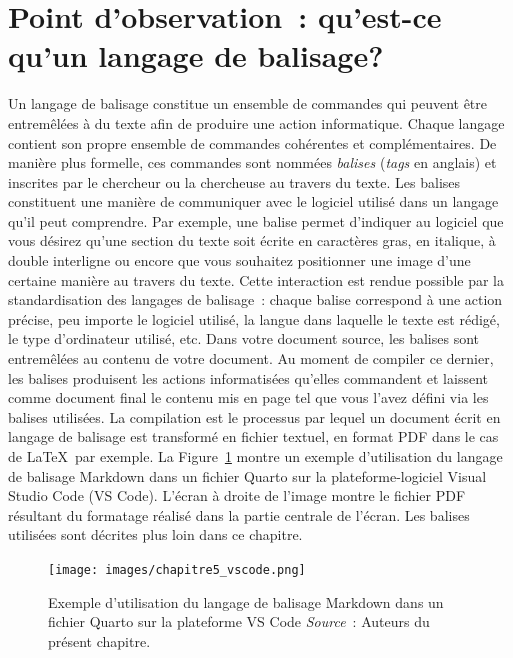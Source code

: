 \documentclass[
  letterpaper,
  DIV=11,
  numbers=noendperiod]{scrreprt}
\begin{document}
\hypertarget{point-dobservation-quest-ce-quun-langage-de-balisage}{%
\section{Point d'observation~: qu'est-ce qu'un langage de
balisage?}\label{point-dobservation-quest-ce-quun-langage-de-balisage}}

Un langage de balisage constitue un ensemble de commandes qui peuvent
être entremêlées à du texte afin de produire une action informatique.
Chaque langage contient son propre ensemble de commandes cohérentes et
complémentaires. De manière plus formelle, ces commandes sont nommées
\emph{balises} (\emph{tags} en anglais) et inscrites par le chercheur ou
la chercheuse au travers du texte. Les balises constituent une manière
de communiquer avec le logiciel utilisé dans un langage qu'il peut
comprendre. Par exemple, une balise permet d'indiquer au logiciel que
vous désirez qu'une section du texte soit écrite en caractères gras, en
italique, à double interligne ou encore que vous souhaitez positionner
une image d'une certaine manière au travers du texte. Cette interaction
est rendue possible par la standardisation des langages de balisage~:
chaque balise correspond à une action précise, peu importe le logiciel
utilisé, la langue dans laquelle le texte est rédigé, le type
d'ordinateur utilisé, etc. Dans votre document source, les balises sont
entremêlées au contenu de votre document. Au moment de compiler ce
dernier, les balises produisent les actions informatisées qu'elles
commandent et laissent comme document final le contenu mis en page tel
que vous l'avez défini via les balises utilisées. La compilation est le
processus par lequel un document écrit en langage de balisage est
transformé en fichier textuel, en format PDF dans le cas de \LaTeX~par
exemple. La Figure~\ref{fig-vscode} montre un exemple d'utilisation du
langage de balisage Markdown dans un fichier Quarto sur la
plateforme-logiciel Visual Studio Code (VS Code). L'écran à droite de
l'image montre le fichier PDF résultant du formatage réalisé dans la
partie centrale de l'écran. Les balises utilisées sont décrites plus
loin dans ce chapitre.

\begin{figure}

{\centering \texttt{[image: images/chapitre5\_vscode.png]}

}

\caption{\label{fig-vscode}Exemple d'utilisation du langage de balisage
Markdown dans un fichier Quarto sur la plateforme VS Code
\newline \textit{Source}~: Auteurs du présent chapitre.}

\end{figure}
\end{document}

